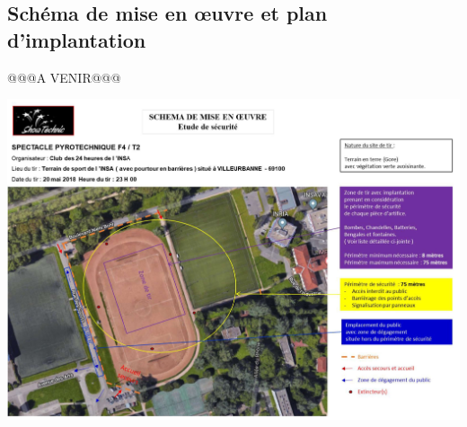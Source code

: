 \documentclass[hidelinks, paper=a4, fontsize=13pt]{report}
\begin{document}
\subsection{Schéma de mise en œuvre et plan d’implantation}
@@@A VENIR@@@
\begin{center}
	\includegraphics[width=\textwidth,keepaspectratio, angle=90]{Annexes/Documents/PlanImplantationFeuArtifice}
\end{center}
\end{document}
